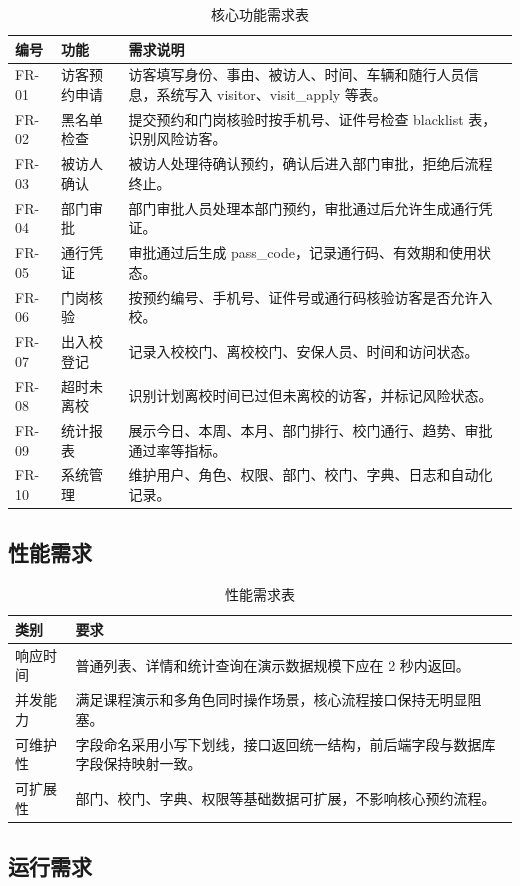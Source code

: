 \begin{longtable}{>{\raggedright\arraybackslash}p{}>{\raggedright\arraybackslash}p{}>{\raggedright\arraybackslash}p{}}
\caption{核心功能需求表}\\
\toprule
编号 & 功能 & 需求说明 \\
\midrule
FR-01 & 访客预约申请 & 访客填写身份、事由、被访人、时间、车辆和随行人员信息，系统写入 visitor、visit\_apply 等表。 \\
FR-02 & 黑名单检查 & 提交预约和门岗核验时按手机号、证件号检查 blacklist 表，识别风险访客。 \\
FR-03 & 被访人确认 & 被访人处理待确认预约，确认后进入部门审批，拒绝后流程终止。 \\
FR-04 & 部门审批 & 部门审批人员处理本部门预约，审批通过后允许生成通行凭证。 \\
FR-05 & 通行凭证 & 审批通过后生成 pass\_code，记录通行码、有效期和使用状态。 \\
FR-06 & 门岗核验 & 按预约编号、手机号、证件号或通行码核验访客是否允许入校。 \\
FR-07 & 出入校登记 & 记录入校校门、离校校门、安保人员、时间和访问状态。 \\
FR-08 & 超时未离校 & 识别计划离校时间已过但未离校的访客，并标记风险状态。 \\
FR-09 & 统计报表 & 展示今日、本周、本月、部门排行、校门通行、趋势、审批通过率等指标。 \\
FR-10 & 系统管理 & 维护用户、角色、权限、部门、校门、字典、日志和自动化记录。 \\
\bottomrule
\end{longtable}\subsection{性能需求}
\begin{longtable}{>{\raggedright\arraybackslash}p{}>{\raggedright\arraybackslash}p{}}
\caption{性能需求表}\\
\toprule
类别 & 要求 \\
\midrule
响应时间 & 普通列表、详情和统计查询在演示数据规模下应在 2 秒内返回。 \\
并发能力 & 满足课程演示和多角色同时操作场景，核心流程接口保持无明显阻塞。 \\
可维护性 & 字段命名采用小写下划线，接口返回统一结构，前后端字段与数据库字段保持映射一致。 \\
可扩展性 & 部门、校门、字典、权限等基础数据可扩展，不影响核心预约流程。 \\
\bottomrule
\end{longtable}\subsection{运行需求}
